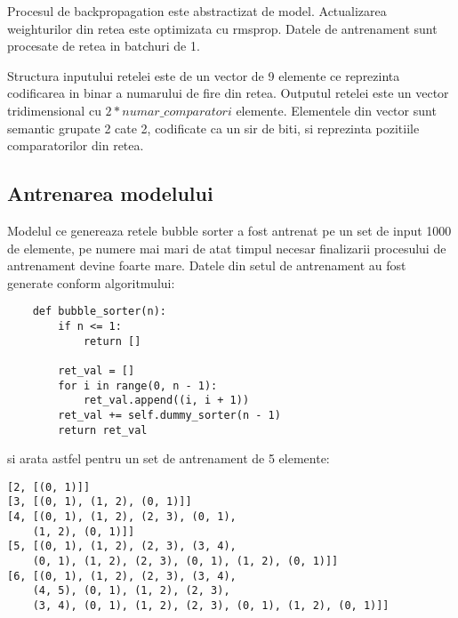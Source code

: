\documentclass{article}%
\begin{document}
Procesul de backpropagation este abstractizat de model. Actualizarea weighturilor din retea este optimizata cu rmsprop.
Datele de antrenament sunt procesate de retea in batchuri de 1.

Structura inputului retelei este de un vector de 9 elemente ce reprezinta codificarea in binar a numarului de fire din retea. Outputul retelei este un vector tridimensional cu $2*numar\_comparatori$ elemente. Elementele din vector sunt semantic grupate 2 cate 2, codificate ca un sir de biti, si reprezinta pozitiile comparatorilor din retea. 

\subsection{Antrenarea modelului}

Modelul ce genereaza retele bubble sorter a fost antrenat pe un set de input 1000 de elemente, pe numere mai mari de atat timpul necesar finalizarii procesului de antrenament devine foarte mare. Datele din setul de antrenament au fost generate conform algoritmului:
\begin{lstlisting}
    def bubble_sorter(n):
        if n <= 1:
            return []

        ret_val = []
        for i in range(0, n - 1):
            ret_val.append((i, i + 1))
        ret_val += self.dummy_sorter(n - 1)
        return ret_val
\end{lstlisting}

si arata astfel pentru un set de antrenament de 5 elemente:

\begin{lstlisting}
[2, [(0, 1)]]
[3, [(0, 1), (1, 2), (0, 1)]]
[4, [(0, 1), (1, 2), (2, 3), (0, 1), 
	(1, 2), (0, 1)]]
[5, [(0, 1), (1, 2), (2, 3), (3, 4), 
	(0, 1), (1, 2), (2, 3), (0, 1), (1, 2), (0, 1)]]
[6, [(0, 1), (1, 2), (2, 3), (3, 4), 
	(4, 5), (0, 1), (1, 2), (2, 3), 
	(3, 4), (0, 1), (1, 2), (2, 3), (0, 1), (1, 2), (0, 1)]]
\end{lstlisting}
\end{document}
